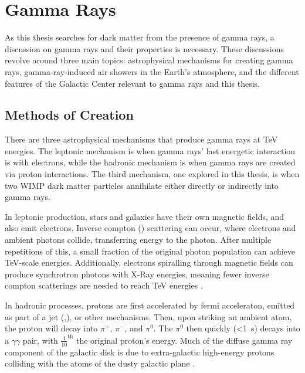 \cleartooddpage[\thispagestyle{empty}]
\chapter{Gamma Rays}

As this thesis searches for dark matter from the presence of gamma rays, a discussion on gamma rays and their properties is necessary.
These discussions revolve around three main topics: astrophysical mechanisms for creating gamma rays, gamma-ray-induced air showers in the Earth's atmosphere, and the different features of the Galactic Center relevant to gamma rays and this thesis.


\section{Methods of Creation}

  There are three astrophysical mechanisms that produce gamma rays at TeV energies.
  The leptonic mechanism is when gamma rays' last energetic interaction is with electrons, while the hadronic mechanism is when gamma rays are created via proton interactions.
  The third mechanism, one explored in this thesis, is when two WIMP dark matter particles annihilate either directly or indirectly into gamma rays.

  In leptonic production, stars and galaxies have their own magnetic fields, and also emit electrons.
  Inverse compton (\cite{compton_effect}) scattering can occur, where electrons and ambient photons collide, transferring energy to the photon.
  After multiple repetitions of this, a small fraction of the original photon population can achieve TeV-scale energies.
  Additionally, electrons spiralling through magnetic fields can produce synchrotron photons with X-Ray energies, meaning fewer inverse compton scatterings are needed to reach TeV energies \cite{self_compton}.

  In hadronic processes, protons are first accelerated by fermi acceleraton, emitted as part of a jet (\cite{hadronic1},\cite{hadronic2}), or other mechanisms.
  Then, upon striking an ambient atom, the proton will decay into $\pi^{+}$, $\pi^{-}$, and $\pi^{0}$.
  The $\pi^{0}$ then quickly (<\SI{1}{s}) decays into a $\gamma\gamma$ pair, with \nicetilde $\frac{1}{10}^{\text{th}}$ the original proton's energy.
  Much of the diffuse gamma ray component of the galactic disk is due to extra-galactic high-energy protons colliding with the atoms of the dusty galactic plane \cite{GalacticDiffuseGammaRays}.


